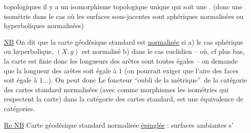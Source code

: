 topologiques il y a un isomorphisme topologique unique qui soit une  . (donc une isométrie dans le cas où les surfaces sous-jacentes sont  sphériques normalisées ou hyperboliques normalisées)


\uline{NB} On dit que la carte géodésique standard est \uline{normalisée} si a)  le cas sphérique ou hyperbolique, $(X,g)$ est normalisé b) dans le cas euclidien -- où, cf plus bas, la carte est  finie  donc les longueurs des arêtes sont toutes égales -- on demande que la longueur des arêtes soit égale à $1$ (on pourrait   exiger que l'aire des faces soit égale à $1\ldots$). On peut donc   Le foncteur \textquotedblleft oubli de la métrique\textquotedblright\ de la catégorie des cartes    standard normalisées (avec comme morphismes les isométries qui respectent la carte) dans la catégorie des cartes standard, est une équivalence de catégories.

\uline{Re NB} Carte géodésique standard normalisée \uline{épinglée} :  surfaces ambiantes s'%

